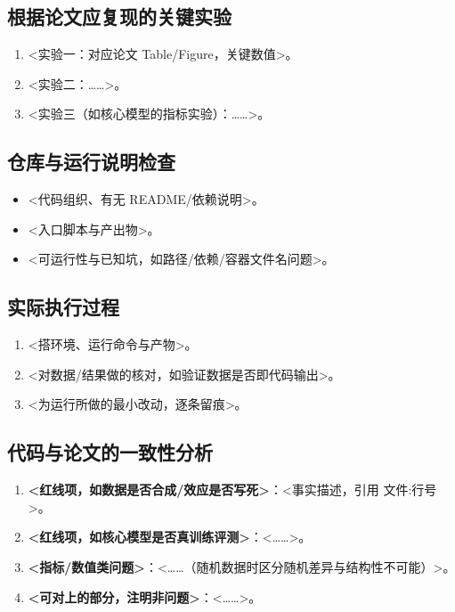 \documentclass[11pt]{article}
\begin{document}
\subsection{根据论文应复现的关键实验}
\begin{enumerate}[leftmargin=2em]
  \item <实验一：对应论文 Table/Figure，关键数值>。
  \item <实验二：……>。
  \item <实验三（如核心模型的指标实验）：……>。
\end{enumerate}

\subsection{仓库与运行说明检查}
\begin{itemize}[leftmargin=2em]
  \item <代码组织、有无 README/依赖说明>。
  \item <入口脚本与产出物>。
  \item <可运行性与已知坑，如路径/依赖/容器文件名问题>。
\end{itemize}

\subsection{实际执行过程}
\begin{enumerate}[leftmargin=2em]
  \item <搭环境、运行命令与产物>。
  \item <对数据/结果做的核对，如验证数据是否即代码输出>。
  \item <为运行所做的最小改动，逐条留痕>。
\end{enumerate}

\subsection{代码与论文的一致性分析}
\begin{enumerate}[leftmargin=2em]
  \item \textbf{<红线项，如数据是否合成/效应是否写死>}：<事实描述，引用 文件:行号>。
  \item \textbf{<红线项，如核心模型是否真训练评测>}：<……>。
  \item \textbf{<指标/数值类问题>}：<……（随机数据时区分随机差异与结构性不可能）>。
  \item \textbf{<可对上的部分，注明非问题>}：<……>。
\end{enumerate}
\end{document}
